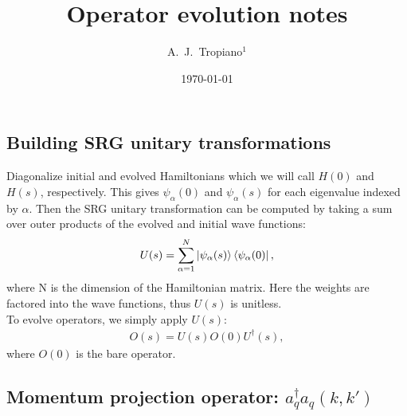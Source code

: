 \documentclass[preprintnumbers,floatfix,aps,prc,preprint,nofootinbib]{revtex4-1}
\begin{document}
\title{Operator evolution notes}


\author{A.~J.~Tropiano$^{1}$}


\date{\today}

\maketitle

\newpage


\subsection{Building SRG unitary transformations}
\label{sec:srg_unitary_transformations}


Diagonalize initial and evolved Hamiltonians which we will call $H(0)$ and $H(s)$, respectively. This gives $\psi_{\alpha}(0)$ and $\psi_{\alpha}(s)$ for each eigenvalue indexed by $\alpha$. Then the SRG unitary transformation can be computed by taking a sum over outer products of the evolved and initial wave functions:
%
\begin{eqnarray}
	\label{eq:unitary_transformation}
	U(s) = \sum_{\alpha=1}^{N} \ket{\psi_{\alpha}(s)} \bra{\psi_{\alpha}(0)},
\end{eqnarray}
%
where N is the dimension of the Hamiltonian matrix. Here the weights are factored into the wave functions, thus $U(s)$ is unitless.
\\

To evolve operators, we simply apply $U(s)$:
%
\begin{eqnarray}
	\label{eq:evolved_operator}
	O(s) = U(s) O(0) U^{\dagger}(s),
\end{eqnarray}
%
where $O(0)$ is the bare operator.


\subsection{Momentum projection operator: $a^{\dagger}_q a_q (k, k')$}
\label{sec:momentum_proj_operator}
\end{document}
